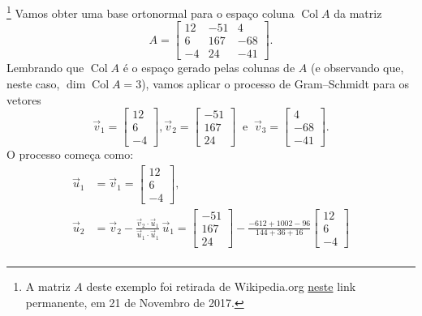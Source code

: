 \begin{ex}\footnote{A matriz $A$ deste exemplo foi retirada de Wikipedia.org \href{https://en.wikipedia.org/w/index.php?title=QR_decomposition&oldid=810854220}{neste} link permanente, em 21 de Novembro de 2017.}
Vamos obter uma base ortonormal para o espaço coluna $\operatorname{Col} A$ da matriz
\begin{equation}
A =
\begin{bmatrix}
12 & -51 & 4 \\
6 & 167 & -68 \\
-4 & 24 & -41
\end{bmatrix}.
\end{equation} Lembrando que $\operatorname{Col} A$ é o espaço gerado pelas colunas de $A$ (e observando que, neste caso, $\dim \operatorname{Col} A = 3$), vamos aplicar o processo de Gram--Schmidt para os vetores
\begin{equation}
\vec{v}_1 =
\begin{bmatrix}
12 \\
6 \\
-4
\end{bmatrix},
\vec{v}_2 =
\begin{bmatrix}
 -51  \\
 167  \\
 24
\end{bmatrix} \ \text{ e } \ \vec{v}_3 =
\begin{bmatrix}
  4 \\
 -68 \\
 -41
\end{bmatrix}.
\end{equation} O processo começa como:
\begin{align*}
\vec{u}_1 & = \vec{v}_1 =
\begin{bmatrix}
12 \\
6 \\
-4
\end{bmatrix}, \\
\vec{u}_2 &  = \vec{v}_2 - \frac{\vec{v}_2 \cdot \vec{u}_1}{\vec{u}_1 \cdot \vec{u}_1} \, \vec{u}_1 =
\begin{bmatrix}
 -51  \\
 167  \\
 24
\end{bmatrix} - \frac{-612 +1002 - 96}{144 + 36 + 16}
\begin{bmatrix}
12 \\
6 \\
-4
\end{bmatrix}\\

\end{align*}
\end{ex}
